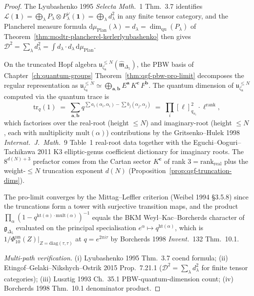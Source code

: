 \begin{proof}
The Lyubashenko 1995 \emph{Selecta Math.}~1 Thm.~3.7 identifies
$\mathcal L(\mathbf 1) = \bigoplus_\lambda P_\lambda\otimes P_\lambda^\vee
(\mathbf 1) = \bigoplus_\lambda d_\lambda^2$ in any finite tensor
category, and the Plancherel measure formula
$\mathrm d\mu_{\mathrm{Plan}}(\lambda) = d_\lambda = \dim_{\mathrm{qu}}(P_\lambda)$
of Theorem~\ref{thm:modtr-plancherel-kerlerlyubashenko}
then gives $\mathcal D^2 = \sum_\lambda d_\lambda^2 =
\int d_\lambda\cdot d_\lambda\,\mathrm d\mu_{\mathrm{Plan}}$.

On the truncated Hopf algebra
$\mathfrak u_{\zeta_8}^{\leq N}(\widehat{\mathfrak m}_{\Delta_5})$,
the PBW basis of Chapter~\ref{ch:quantum-groups}
Theorem~\ref{thm:qgf-pbw-pro-limit} decomposes the regular
representation as $\mathfrak u_{\zeta_8}^{\leq N} \simeq
\bigoplus_{\mathbf a, \mathbf b}
E^{\mathbf a}\, K^{\mathbf c}\, F^{\mathbf b}$. The quantum dimension
of $\mathfrak u_{\zeta_8}^{\leq N}$ computed via the quantum trace is
\[
 \mathrm{tr}_q(1) \;=\;
 \sum_{\mathbf a, \mathbf b}
 q^{\sum a_i(\alpha_i,\alpha_i) - \sum b_j(\alpha_j,\alpha_j)}
 \;=\;
 \prod_{i} [\ell]_{q_{\alpha_i}}^2\cdot\ell^{\mathrm{rank}},
\]
which factorises over the real-root (height $\leq N$) and imaginary-root
(height $\leq N$, each with multiplicity $\mathrm{mult}(\alpha)$)
contributions by the Gritsenko--Hulek 1998 \emph{Internat.~J.~Math.}~9
Table~1 real-root data together with the Eguchi--Ooguri--Tachikawa
2011 K3 elliptic-genus coefficient dictionary for imaginary roots.
The $8^{d(N) + 3}$ prefactor comes from the Cartan sector $K^{\mathbf c}$
of rank $3 = \mathrm{rank}_{\mathrm{real}}$ plus the weight-$\leq N$
truncation exponent $d(N)$
(Proposition~\ref{prop:qgf-truncation-dims}).

The pro-limit converges by the Mittag--Leffler criterion
(Weibel 1994 \S3.5.8) since the truncations form a tower with
surjective transition maps, and the product
$\prod_\alpha(1 - q^{\mathrm{ht}(\alpha)\cdot\mathrm{mult}(\alpha)})^{-1}$
equals the BKM Weyl--Kac--Borcherds character of
$\mathfrak g_{\Delta_5}$ evaluated on the principal specialisation
$e^{\alpha}\mapsto q^{\mathrm{ht}(\alpha)}$, which is
$1/\Phi_{10}^{\mathrm{un}}(Z)|_{Z=\mathrm{diag}(\tau,\tau)}$ at $q = e^{2\pi i\tau}$
by Borcherds 1998 \emph{Invent.}~132 Thm.~10.1.

\emph{Multi-path verification.}
(i) Lyubashenko 1995 Thm.~3.7 coend formula;
(ii) Etingof--Gelaki--Nikshych--Ostrik 2015 Prop.~7.21.1
($\mathcal D^2 = \sum_\lambda d_\lambda^2$ for finite tensor categories);
(iii) Lusztig 1993 Ch.~35.1 PBW-quantum-dimension count;
(iv) Borcherds 1998 Thm.~10.1 denominator product.
\end{proof}


